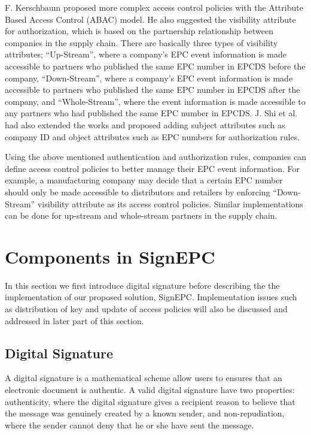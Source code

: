 \documentclass[conference]{IEEEtran}
\begin{document}
F. Kerschbaum \cite{ker:acc} proposed more complex access control policies with the Attribute Based Access Control (ABAC) model. He also suggested the visibility attribute for authorization, which is based on the partnership relationship between companies in the supply chain. There are basically three types of visibility attributes; ``Up-Stream'', where a company's EPC event information is made accessible to partners who published the same EPC number in EPCDS before the company,  ``Down-Stream'', where a company's EPC event information is made accessible to partners who published the same EPC number in EPCDS after the company, and ``Whole-Stream'', where the event information is made accessible to any partners who had published the same EPC number in EPCDS. J. Shi et al. \cite{shi:secds} had also extended the works and proposed adding subject attributes such as company ID and object attributes such as EPC numbers for authorization rules.

Using the above mentioned authentication and authorization rules, companies can define access control policies to better manage their EPC event information. For example, a manufacturing company may decide that a certain EPC number should only be made accessible to distributors and retailers by enforcing ``Down-Stream'' visibility attribute as its access control policies. Similar implementations can be done for up-stream and whole-stream partners in the supply chain. 

\section {Components in SignEPC}
\label{sec:signepc}
In this section we first introduce digital signature before describing the the implementation of our proposed solution, SignEPC. Implementation issues such as distribution of key and update of access policies will also be discussed and addressed in later part of this section. 

\subsection {Digital Signature}
A digital signature is a mathematical scheme allow users to ensures that an electronic document is authentic.  A valid digital signature have two properties:  authenticity, where the digital signature gives a recipient reason to believe that the message was genuinely created by a known sender, and non-repudiation, where the sender cannot deny that he or she have sent the message. 
\end{document}
